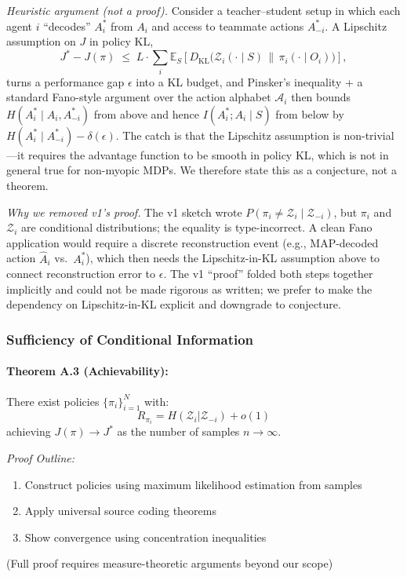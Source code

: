 \documentclass[10pt, letterpaper]{article}
\begin{document}
\emph{Heuristic argument (not a proof).} Consider a teacher--student setup in which each agent $i$ ``decodes'' $A_i^*$ from $A_i$ and access to teammate actions $A_{-i}^*$. A Lipschitz assumption on $J$ in policy KL,
\[J^* - J(\pi) \;\leq\; L \cdot \sum_i \mathbb{E}_S\!\left[D_\text{KL}\bigl(\mathcal{Z}_i(\cdot \mid S) \,\|\, \pi_i(\cdot \mid O_i)\bigr)\right],\]
turns a performance gap $\epsilon$ into a KL budget, and Pinsker's inequality + a standard Fano-style argument over the action alphabet $\mathcal{A}_i$ then bounds $H(A_i^*\mid A_i, A_{-i}^*)$ from above and hence $I(A_i^*; A_i \mid S)$ from below by $H(A_i^*\mid A_{-i}^*) - \delta(\epsilon)$. The catch is that the Lipschitz assumption is non-trivial---it requires the advantage function to be smooth in policy KL, which is not in general true for non-myopic MDPs. We therefore state this as a conjecture, not a theorem.

\emph{Why we removed v1's proof.} The v1 sketch wrote $P(\pi_i \neq \mathcal{Z}_i \mid \mathcal{Z}_{-i})$, but $\pi_i$ and $\mathcal{Z}_i$ are conditional distributions; the equality is type-incorrect. A clean Fano application would require a discrete reconstruction event (e.g., MAP-decoded action $\hat{A}_i$ vs.\ $A_i^*$), which then needs the Lipschitz-in-KL assumption above to connect reconstruction error to $\epsilon$. The v1 ``proof'' folded both steps together implicitly and could not be made rigorous as written; we prefer to make the dependency on Lipschitz-in-KL explicit and downgrade to conjecture.

\subsubsection{Sufficiency of Conditional Information}

\paragraph{Theorem A.3 (Achievability):} There exist policies $\{\pi_i\}_{i=1}^N$ with:
\[R_{\pi_i} = H(\mathcal{Z}_i | \mathcal{Z}_{-i}) + o(1)\]
achieving $J(\pi) \to J^*$ as the number of samples $n \to \infty$.

\emph{Proof Outline:}
\begin{enumerate}
    \item Construct policies using maximum likelihood estimation from samples
    \item Apply universal source coding theorems
    \item Show convergence using concentration inequalities
\end{enumerate}
(Full proof requires measure-theoretic arguments beyond our scope)
\end{document}
